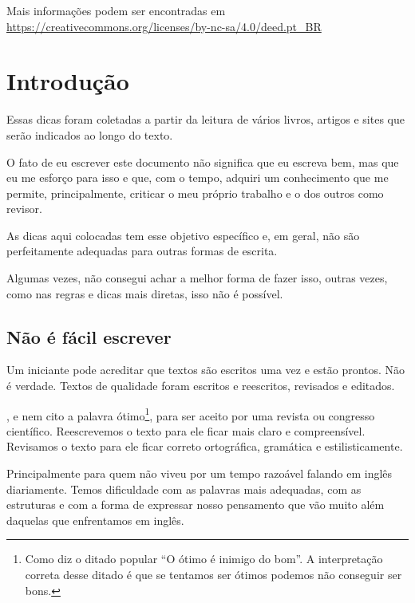 \documentclass[openany]{book}
\begin{document}
Mais informações podem ser encontradas em \url{https://creativecommons.org/licenses/by-nc-sa/4.0/deed.pt_BR}

\mainmatter

\chapter{Introdução}
 Essas dicas foram coletadas a partir da leitura de vários livros, artigos e sites que serão indicados ao longo do texto.

O fato de eu escrever este documento não significa que eu escreva bem, mas que eu me esforço para isso e que, com o tempo, adquiri um conhecimento que me permite, principalmente, criticar o meu próprio trabalho e o dos outros como revisor.

As dicas aqui colocadas tem esse objetivo específico e, em geral, não são perfeitamente adequadas para outras formas de escrita.

 Algumas vezes, não consegui achar a melhor forma de fazer isso, outras vezes, como nas regras e dicas mais diretas, isso não é possível.

\section{Não é fácil escrever}

 Um iniciante pode acreditar que textos são escritos uma vez e estão prontos. Não é verdade. Textos de qualidade foram escritos e reescritos, revisados e editados.

, e nem cito a palavra ótimo\footnote{Como diz o ditado popular ``O ótimo é inimigo do bom''. A interpretação correta desse ditado é que se tentamos ser ótimos podemos não conseguir ser bons.}, para ser aceito por uma revista ou congresso científico. Reescrevemos o texto para ele ficar mais claro e  compreensível. Revisamos o texto para ele ficar correto ortográfica, gramática e estilisticamente.

 Principalmente para quem não viveu por um tempo razoável falando em inglês diariamente. Temos dificuldade com as palavras mais adequadas, com as estruturas e com a forma de expressar nosso pensamento que vão muito além daquelas que enfrentamos em inglês.
\end{document}

